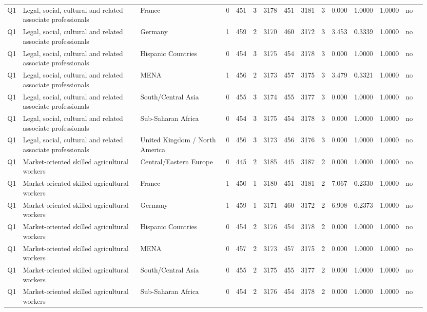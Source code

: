 \begin{longtable}{lllrcccccccccll}
Q1 & Legal, social, cultural and related associate professionals & France & 0 & 451 & 3 & 3178 & 451 & 3181 & 3 & 0.000 & 1.0000 & 1.0000 & no \\
Q1 & Legal, social, cultural and related associate professionals & Germany & 1 & 459 & 2 & 3170 & 460 & 3172 & 3 & 3.453 & 0.3339 & 1.0000 & no \\
Q1 & Legal, social, cultural and related associate professionals & Hispanic Countries & 0 & 454 & 3 & 3175 & 454 & 3178 & 3 & 0.000 & 1.0000 & 1.0000 & no \\
Q1 & Legal, social, cultural and related associate professionals & MENA & 1 & 456 & 2 & 3173 & 457 & 3175 & 3 & 3.479 & 0.3321 & 1.0000 & no \\
Q1 & Legal, social, cultural and related associate professionals & South/Central Asia & 0 & 455 & 3 & 3174 & 455 & 3177 & 3 & 0.000 & 1.0000 & 1.0000 & no \\
Q1 & Legal, social, cultural and related associate professionals & Sub-Saharan Africa & 0 & 454 & 3 & 3175 & 454 & 3178 & 3 & 0.000 & 1.0000 & 1.0000 & no \\
Q1 & Legal, social, cultural and related associate professionals & United Kingdom / North America & 0 & 456 & 3 & 3173 & 456 & 3176 & 3 & 0.000 & 1.0000 & 1.0000 & no \\
Q1 & Market-oriented skilled agricultural workers & Central/Eastern Europe & 0 & 445 & 2 & 3185 & 445 & 3187 & 2 & 0.000 & 1.0000 & 1.0000 & no \\
Q1 & Market-oriented skilled agricultural workers & France & 1 & 450 & 1 & 3180 & 451 & 3181 & 2 & 7.067 & 0.2330 & 1.0000 & no \\
Q1 & Market-oriented skilled agricultural workers & Germany & 1 & 459 & 1 & 3171 & 460 & 3172 & 2 & 6.908 & 0.2373 & 1.0000 & no \\
Q1 & Market-oriented skilled agricultural workers & Hispanic Countries & 0 & 454 & 2 & 3176 & 454 & 3178 & 2 & 0.000 & 1.0000 & 1.0000 & no \\
Q1 & Market-oriented skilled agricultural workers & MENA & 0 & 457 & 2 & 3173 & 457 & 3175 & 2 & 0.000 & 1.0000 & 1.0000 & no \\
Q1 & Market-oriented skilled agricultural workers & South/Central Asia & 0 & 455 & 2 & 3175 & 455 & 3177 & 2 & 0.000 & 1.0000 & 1.0000 & no \\
Q1 & Market-oriented skilled agricultural workers & Sub-Saharan Africa & 0 & 454 & 2 & 3176 & 454 & 3178 & 2 & 0.000 & 1.0000 & 1.0000 & no \\

\end{longtable}
